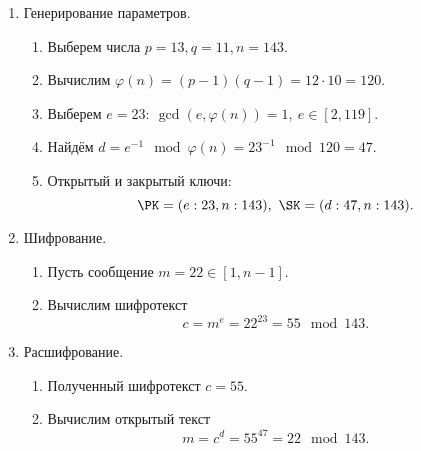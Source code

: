 \begin{enumerate}
    \item Генерирование параметров.
        \begin{enumerate}
            \item Выберем числа $p=13, q=11, n = 143$.
            \item Вычислим $\varphi(n) = (p-1)(q-1) = 12 \cdot 10 = 120$.
            \item Выберем $e=23: ~ \gcd(e, \varphi(n))=1, ~ e \in [2, 119]$.
            \item Найдём $d = e^{-1} \mod \varphi(n) = 23^{-1} \mod 120 = 47$.
            \item Открытый и закрытый ключи:
                \[ \PK = (e:23, n:143), ~ \SK = (d:47, n:143). \]
        \end{enumerate}
    \item Шифрование.
        \begin{enumerate}
            \item Пусть сообщение $m = 22 \in [1, n-1]$.
            \item Вычислим шифротекст
                \[ c = m^e = 22^{23} = 55 \mod 143. \]
        \end{enumerate}
    \item Расшифрование.
        \begin{enumerate}
            \item Полученный шифротекст $c = 55$.
            \item Вычислим открытый текст
                \[ m = c^d = 55^{47} = 22 \mod 143. \]
        \end{enumerate}
\end{enumerate}
\exampleend


